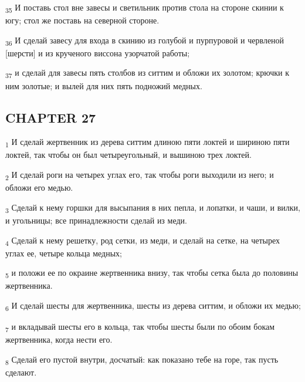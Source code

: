 \begin{tcolorbox}
\textsubscript{35} И поставь стол вне завесы и светильник против стола на стороне скинии к югу; стол же поставь на северной стороне.
\end{tcolorbox}
\begin{tcolorbox}
\textsubscript{36} И сделай завесу для входа в скинию из голубой и пурпуровой и червленой [шерсти] и из крученого виссона узорчатой работы;
\end{tcolorbox}
\begin{tcolorbox}
\textsubscript{37} и сделай для завесы пять столбов из ситтим и обложи их золотом; крючки к ним золотые; и вылей для них пять подножий медных.
\end{tcolorbox}
\subsection{CHAPTER 27}
\begin{tcolorbox}
\textsubscript{1} И сделай жертвенник из дерева ситтим длиною пяти локтей и шириною пяти локтей, так чтобы он был четыреугольный, и вышиною трех локтей.
\end{tcolorbox}
\begin{tcolorbox}
\textsubscript{2} И сделай роги на четырех углах его, так чтобы роги выходили из него; и обложи его медью.
\end{tcolorbox}
\begin{tcolorbox}
\textsubscript{3} Сделай к нему горшки для высыпания в них пепла, и лопатки, и чаши, и вилки, и угольницы; все принадлежности сделай из меди.
\end{tcolorbox}
\begin{tcolorbox}
\textsubscript{4} Сделай к нему решетку, род сетки, из меди, и сделай на сетке, на четырех углах ее, четыре кольца медных;
\end{tcolorbox}
\begin{tcolorbox}
\textsubscript{5} и положи ее по окраине жертвенника внизу, так чтобы сетка была до половины жертвенника.
\end{tcolorbox}
\begin{tcolorbox}
\textsubscript{6} И сделай шесты для жертвенника, шесты из дерева ситтим, и обложи их медью;
\end{tcolorbox}
\begin{tcolorbox}
\textsubscript{7} и вкладывай шесты его в кольца, так чтобы шесты были по обоим бокам жертвенника, когда нести его.
\end{tcolorbox}
\begin{tcolorbox}
\textsubscript{8} Сделай его пустой внутри, досчатый: как показано тебе на горе, так пусть сделают.
\end{tcolorbox}
